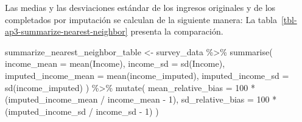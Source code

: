 \documentclass[
  spanish,
  11pt,
  letterpaper,
  oneside,
  open=any]{scrbook}
\newenvironment{Shaded}{\begin{snugshade}}{\end{snugshade}}
\newcommand{\AttributeTok}[1]{\textcolor[rgb]{0.40,0.45,0.13}{#1}}
\newcommand{\ControlFlowTok}[1]{\textcolor[rgb]{0.00,0.23,0.31}{\textbf{#1}}}
\newcommand{\DecValTok}[1]{\textcolor[rgb]{0.68,0.00,0.00}{#1}}
\newcommand{\FunctionTok}[1]{\textcolor[rgb]{0.28,0.35,0.67}{#1}}
\newcommand{\NormalTok}[1]{\textcolor[rgb]{0.00,0.23,0.31}{#1}}
\newcommand{\OtherTok}[1]{\textcolor[rgb]{0.00,0.23,0.31}{#1}}
\newcommand{\SpecialCharTok}[1]{\textcolor[rgb]{0.37,0.37,0.37}{#1}}
\begin{document}
\begin{Shaded}
\end{Shaded}

Las medias y las desviaciones estándar de los ingresos originales y de
los completados por imputación se calculan de la siguiente manera: La
tabla~\ref{tbl-ap3-summarize-nearest-neighbor} presenta la comparación.

\begin{Shaded}
\begin{Highlighting}[]
\NormalTok{summarize\_nearest\_neighbor\_table }\OtherTok{\textless{}{-}}\NormalTok{ survey\_data }\SpecialCharTok{\%\textgreater{}\%}
  \FunctionTok{summarise}\NormalTok{(}
    \AttributeTok{income\_mean =} \FunctionTok{mean}\NormalTok{(Income),}
    \AttributeTok{income\_sd =} \FunctionTok{sd}\NormalTok{(Income),}
    \AttributeTok{imputed\_income\_mean =} \FunctionTok{mean}\NormalTok{(income\_imputed),}
    \AttributeTok{imputed\_income\_sd =} \FunctionTok{sd}\NormalTok{(income\_imputed)}
\NormalTok{  ) }\SpecialCharTok{\%\textgreater{}\%}
  \FunctionTok{mutate}\NormalTok{(}
    \AttributeTok{mean\_relative\_bias =} \DecValTok{100} \SpecialCharTok{*}\NormalTok{ (imputed\_income\_mean }\SpecialCharTok{/}\NormalTok{ income\_mean }\SpecialCharTok{{-}} \DecValTok{1}\NormalTok{),}
    \AttributeTok{sd\_relative\_bias =} \DecValTok{100} \SpecialCharTok{*}\NormalTok{ (imputed\_income\_sd }\SpecialCharTok{/}\NormalTok{ income\_sd }\SpecialCharTok{{-}} \DecValTok{1}\NormalTok{)}
\NormalTok{  )}
\end{Highlighting}
\end{Shaded}
\end{document}
